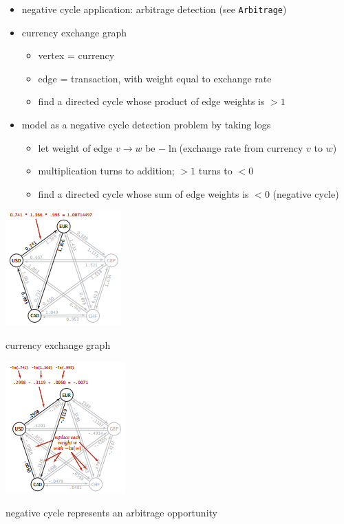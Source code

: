 \documentclass[8pt,a4paper,compress]{beamer}
\begin{document}
\begin{frame}[fragile]
\begin{minipage}{200pt}
\begin{itemize}
\item negative cycle application: arbitrage detection (see \lstinline{Arbitrage})

\item currency exchange graph
\begin{itemize}
\item vertex = currency

\item edge = transaction, with weight equal to exchange rate

\item find a directed cycle whose product of edge weights is $> 1$
\end{itemize}

\item model as a negative cycle detection problem by taking logs
\begin{itemize}
\item let weight of edge $v \to w$ be $-\ln$(exchange rate from currency $v$ to $w$)

\item multiplication turns to addition; $> 1$ turns to $< 0$

\item find a directed cycle whose sum of edge weights is $< 0$ (negative cycle)
\end{itemize}
\end{itemize}
\end{minipage}%
\begin{minipage}{100pt}
\begin{center}
\includegraphics[scale=0.43]{./figures/sp7.png}

\smallskip

\small currency exchange graph

\includegraphics[scale=0.43]{./figures/sp8.png}

\smallskip

\small negative cycle represents an arbitrage opportunity
\end{center}
\end{minipage}
\end{frame}
\end{document}
